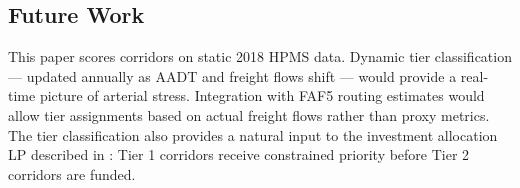 \subsection*{Future Work}

This paper scores corridors on static 2018 HPMS data. Dynamic tier classification --- updated annually as AADT and freight flows shift --- would provide a real-time picture of arterial stress. Integration with FAF5 routing estimates would allow tier assignments based on actual freight flows rather than proxy metrics. The tier classification also provides a natural input to the investment allocation LP described in \citet{route_invest_2026}: Tier 1 corridors receive constrained priority before Tier 2 corridors are funded.
